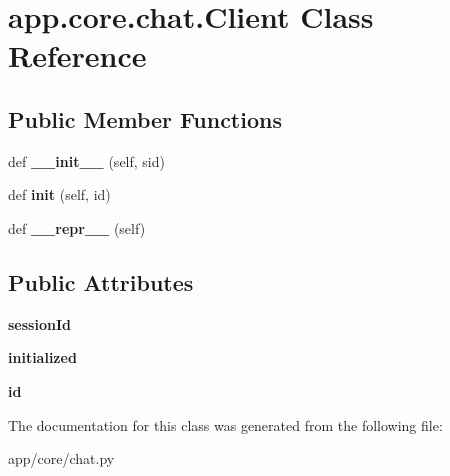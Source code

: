\hypertarget{classapp_1_1core_1_1chat_1_1_client}{}\section{app.\+core.\+chat.\+Client Class Reference}
\label{classapp_1_1core_1_1chat_1_1_client}
\subsection*{Public Member Functions}
\begin{DoxyCompactItemize}
\item 
\mbox{\label{classapp_1_1core_1_1chat_1_1_client_aca8f6905d4537b2673639d95feac46e4}} 
def {\bfseries \+\_\+\+\_\+init\+\_\+\+\_\+} (self, sid)
\item 
\mbox{\label{classapp_1_1core_1_1chat_1_1_client_a9d2efe5d00a0cf493d93f223ffb4b818}} 
def {\bfseries init} (self, id)
\item 
\mbox{\label{classapp_1_1core_1_1chat_1_1_client_aafec2e75d81189f30ee4515a66b57ee8}} 
def {\bfseries \+\_\+\+\_\+repr\+\_\+\+\_\+} (self)
\end{DoxyCompactItemize}
\subsection*{Public Attributes}
\begin{DoxyCompactItemize}
\item 
\mbox{\label{classapp_1_1core_1_1chat_1_1_client_a3804a2ac18ecc0f8cfe7b44c67661011}} 
{\bfseries session\+Id}
\item 
\mbox{\label{classapp_1_1core_1_1chat_1_1_client_afce7c0a8ca94a659bb33ed93cc73b2c9}} 
{\bfseries initialized}
\item 
\mbox{\label{classapp_1_1core_1_1chat_1_1_client_af674df1d5ebc02eccd3e4aa54b0ee772}} 
{\bfseries id}
\end{DoxyCompactItemize}


The documentation for this class was generated from the following file\+:\begin{DoxyCompactItemize}
\item 
app/core/chat.\+py\end{DoxyCompactItemize}
